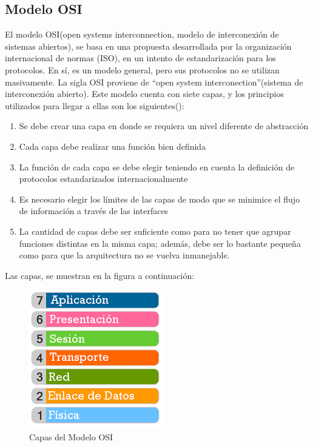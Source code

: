 \subsection{Modelo OSI}
El modelo OSI(open systems interconnection, modelo de interconexión de sistemas abiertos), se basa en una propuesta desarrollada por la organización internacional de normas (ISO), en un intento de estandarización para los protocolos. En sí, es un modelo general, pero sus protocolos no se utilizan masivamente. La sigla OSI proviene de ``open system interconection''(sistema de interconexión abierto). Este modelo cuenta con siete capas, y los principios utilizados para llegar a ellas son los siguientes(\cite{Tanenbaum2003}):
\begin{enumerate}
	\item Se debe crear una capa en donde se requiera un nivel diferente de abstracción 
	\item Cada capa debe realizar una función bien definida 
	\item La función de cada capa se debe elegir teniendo en cuenta la definición de protocolos estandarizados
	internacionalmente
	\item Es necesario elegir los límites de las capas de modo que se minimice el flujo de información a través de las interfaces 
	\item La cantidad de capas debe ser suficiente como para no tener que agrupar funciones distintas en
	la misma capa; además, debe ser lo bastante pequeña como para que la arquitectura no se vuelva
	inmanejable. 
\end{enumerate} 
Las capas, se muestran en la figura a continuación:%
\vspace{-2mm}  
\begin{figure}[ht]
	\centering
	\includegraphics[scale=0.5]{modelosi} 
	\caption{Capas del Modelo OSI}
	\label{fig:mod_osi}
\end{figure}  
%

